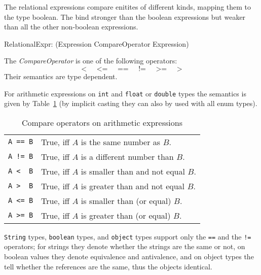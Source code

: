 The relational expressions compare enitites of different kinds, mapping them to the type boolean.
The bind stronger than the boolean expressions but weaker than all the other non-boolean expressions.

\begin{rail}
 RelationalExpr: (Expression CompareOperator Expression)
\end{rail}

The \emph{CompareOperator} is one of the following operators:
\[ \texttt{<} \;\;\;\;\; \texttt{<=} \;\;\;\;\; \texttt{==} \;\;\;\;\; \texttt{!=} \;\;\;\;\; \texttt{>=} \;\;\;\;\; \texttt{>} \]
Their semantics are type dependent.

For arithmetic expressions on \texttt{int} and \texttt{float} or \texttt{double} types
the semantics is given by Table~\ref{compandarithmetic} (by implicit casting they can also by used with all enum types).

\begin{table}[htbp]
  \centering
  \begin{tabularx}{\linewidth}{|l|X|} \hline
    \texttt{A == B} & True, iff $A$ is the same number as $B$. \\
    \texttt{A != B} & True, iff $A$ is a different number than $B$. \\
    \texttt{A <\ \ B} & True, iff $A$ is smaller than and not equal $B$. \\
    \texttt{A >\ \ B} & True, iff $A$ is greater than and not equal $B$. \\
    \texttt{A <= B} & True, iff $A$ is smaller than (or equal) $B$. \\
    \texttt{A >= B} & True, iff $A$ is greater than (or equal) $B$. \\ \hline
  \end{tabularx}
  \caption{Compare operators on arithmetic expressions}
  \label{compandarithmetic}
\end{table}

\texttt{String} types, \texttt{boolean} types, and \texttt{object} types support only the \texttt{==} and the \texttt{!=} operators;
for strings they denote whether the strings are the same or not,
on boolean values they denote equivalence and antivalence,
and on object types the tell whether the references are the same, thus the objects identical.

